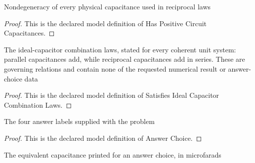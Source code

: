 \begin{definition}
  \label{def:physics:phyx-mini-0877:phyxminiproblems-problemphyxmini0877-haspositivecircuitcapacitances}
  Nondegeneracy of every physical capacitance used in reciprocal laws
\end{definition}
\begin{proof}
  This is the declared model definition of Has Positive Circuit Capacitances.
\end{proof}
\begin{definition}
  \label{def:physics:phyx-mini-0877:phyxminiproblems-problemphyxmini0877-satisfiesidealcapacitorcombinationlaws}
  The ideal-capacitor combination laws, stated for every coherent unit system: parallel capacitances add, while reciprocal capacitances add in series. These are governing relations and contain none of the requested numerical result or answer-choice data
\end{definition}
\begin{proof}
  This is the declared model definition of Satisfies Ideal Capacitor Combination Laws.
\end{proof}
\begin{definition}
  \label{def:physics:phyx-mini-0877:phyxminiproblems-problemphyxmini0877-answerchoice}
  The four answer labels supplied with the problem
\end{definition}
\begin{proof}
  This is the declared model definition of Answer Choice.
\end{proof}
\begin{definition}
  \label{def:physics:phyx-mini-0877:phyxminiproblems-problemphyxmini0877-answerchoice-displayedcapacitanceinmicrofarads}
  The equivalent capacitance printed for an answer choice, in microfarads
\end{definition}
